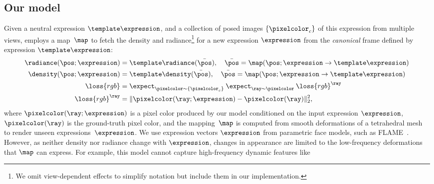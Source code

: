   \subsection{Our model}
    \label{sec:blendfields-model}
    Given a neutral expression $\template\expression$, and a collection of posed
    images $\{\pixelcolor_c\}$ of this expression from multiple views, \VolTeMorph
    employs a map~$\map$ to fetch the density and radiance\footnote{We omit
      view-dependent effects to simplify notation but include them in our
      implementation.
    } for a new expression $\expression$ from the \textit{canonical} frame defined by expression $\template\expression$:
    \begin{align}
      \radiance(\pos; \expression) & = \template\radiance(\bar\pos), \quad \bar\pos = \map(\pos; \expression \rightarrow \template\expression)
      \\
      \density(\pos; \expression)  & = \template\density(\bar\pos), \quad \bar\pos = \map(\pos; \expression \rightarrow \template\expression)
      \label{eq:blendfields-densityVoltemorph}
      \\
      \loss{rgb}                   & =
      \expect_{\pixelcolor \sim \{\pixelcolor_c\}} \:
      \expect_{\ray \sim \pixelcolor} \:
      \loss{rgb}^\ray
      \\
      \loss{rgb}^\ray              & = \| \pixelcolor(\ray; \expression) - \pixelcolor(\ray) \|_2^2,
    \end{align}
    where $\pixelcolor(\ray; \expression)$ is a pixel color produced by our model conditioned on the input expression $\expression$, $\pixelcolor(\ray)$ is the ground-truth pixel color, and the mapping~$\map$ is computed from smooth deformations of a tetrahedral mesh to render unseen expressions~$\expression$.
    We use expression vectors $\expression$ from parametric face models, such as
    FLAME~\cite{li2017flame,wood2021fake}.
    However, as neither density nor radiance change with $\expression$, changes in
    appearance are limited to the low-frequency deformations that $\map$ can
    express.
    For example, this model cannot capture high-frequency dynamic features like
